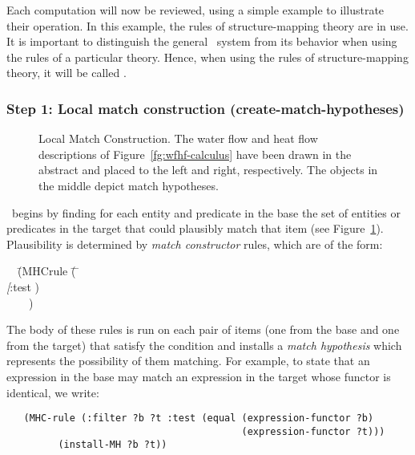 \noindent
Each computation will now be reviewed, using a simple example to
illustrate their operation. In this example, the rules of structure-mapping
theory are in use. It is important to distinguish the general \SME\ system
from its behavior when using the rules of a particular theory. Hence, when
using the rules of structure-mapping theory, it will be called \SMET.

\subsubsection{Step 1: Local match construction (create-match-hypotheses)}

\begin{figure}
\border
\vspace{3.1in}
\caption[Local Match Construction]{Local Match Construction. The water flow
and heat flow descriptions of Figure~\ref{fg:wfhf-calculus} have been drawn
in the abstract and placed to the left and right, respectively. The objects
in the middle depict match hypotheses.}
\label{fg:3D-MH}
\border
\end{figure}


\SME\ begins by finding for each entity and predicate in the base the set of
entities or predicates in the target that could plausibly match that item
(see Figure~\ref{fg:3D-MH}). Plausibility is determined by {\it match
constructor} rules, which are of the form:
\begin{tt}
\begin{tabbing}
\ \ \= (MHCrule \= ( \=   \\
\> \> \> {\it [}:test \metasyntax{TestForm}{\it ]}) \\
\> \ \ \ \  ) \\
\end{tabbing}
\end{tt}

The body of these rules is run on each pair of items (one from the base and
one from the target) that satisfy the condition and installs a {\it match
hypothesis} which represents the possibility of them
matching. For example, to state that an expression in the base may match an
expression in the target whose functor is identical, we write:
\begin{verbatim}
   (MHC-rule (:filter ?b ?t :test (equal (expression-functor ?b)
                                         (expression-functor ?t)))
         (install-MH ?b ?t))
\end{verbatim}


